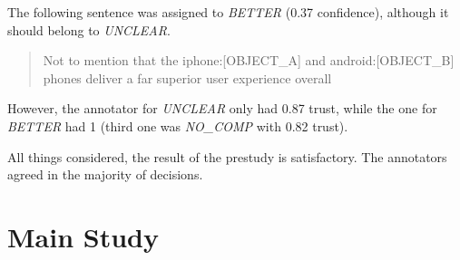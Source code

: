 The following sentence was assigned to \emph{BETTER} (0.37 confidence), although it should belong to \emph{UNCLEAR}.
\begin{quote}
Not to mention that the iphone:[OBJECT\_A] and android:[OBJECT\_B] phones deliver a far superior user experience overall
\end{quote}
However, the annotator for \emph{UNCLEAR} only had 0.87 trust, while the one for \emph{BETTER} had 1 (third one was \emph{NO\_COMP} with 0.82 trust).\newline

All things considered, the result of the prestudy is satisfactory. The annotators agreed in the majority of decisions. 



\section{Main Study}

